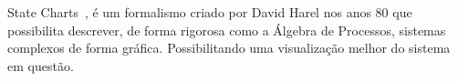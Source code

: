 State Charts~\cite{Harel:1987:SVF:34884.34886}, 
é um formalismo criado por David Harel nos anos 80 
que possibilita descrever, de forma rigorosa como a 
Álgebra de Processos, sistemas complexos de forma gráfica. 
Possibilitando uma visualização melhor do sistema em questão.

